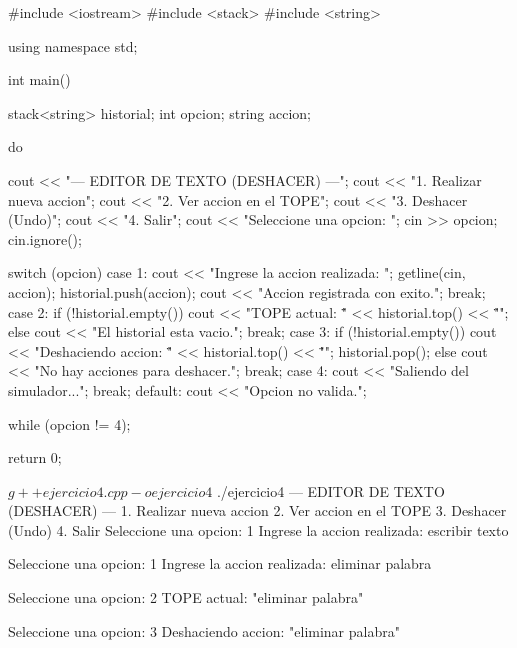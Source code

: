 \documentclass[11pt, a4paper]{article}
\begin{document}
\begin{codebox}[title={CÓDIGO FUENTE: Ejercicio 4}]
#include <iostream>
#include <stack>
#include <string>

using namespace std;

int main() {
    stack<string> historial;
    int opcion;
    string accion;

    do {
        cout << "\n--- EDITOR DE TEXTO (DESHACER) ---\n";
        cout << "1. Realizar nueva accion\n";
        cout << "2. Ver accion en el TOPE\n";
        cout << "3. Deshacer (Undo)\n";
        cout << "4. Salir\n";
        cout << "Seleccione una opcion: ";
        cin >> opcion;
        cin.ignore();

        switch (opcion) {
            case 1:
                cout << "Ingrese la accion realizada: ";
                getline(cin, accion);
                historial.push(accion);
                cout << "Accion registrada con exito.\n";
                break;
            case 2:
                if (!historial.empty()) {
                    cout << "TOPE actual: \"" << historial.top() << "\"\n";
                } else {
                    cout << "El historial esta vacio.\n";
                }
                break;
            case 3:
                if (!historial.empty()) {
                    cout << "Deshaciendo accion: \"" << historial.top() << "\"\n";
                    historial.pop();
                } else {
                    cout << "No hay acciones para deshacer.\n";
                }
                break;
            case 4:
                cout << "Saliendo del simulador...\n";
                break;
            default:
                cout << "Opcion no valida.\n";
        }
    } while (opcion != 4);

    return 0;
}
\end{codebox}

\begin{terminalout}
$ g++ ejercicio4.cpp -o ejercicio4
$ ./ejercicio4
--- EDITOR DE TEXTO (DESHACER) ---
1. Realizar nueva accion
2. Ver accion en el TOPE
3. Deshacer (Undo)
4. Salir
Seleccione una opcion: 1
Ingrese la accion realizada: escribir texto

Seleccione una opcion: 1
Ingrese la accion realizada: eliminar palabra

Seleccione una opcion: 2
TOPE actual: "eliminar palabra"

Seleccione una opcion: 3
Deshaciendo accion: "eliminar palabra"
\end{terminalout}
\end{document}
